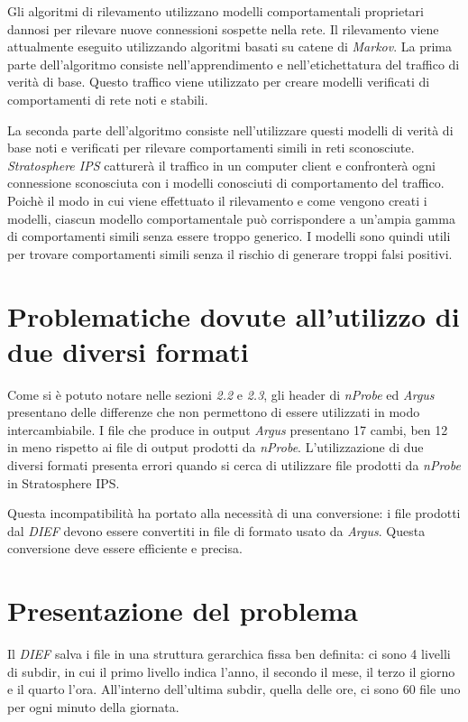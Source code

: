 \documentclass[../main.tex]{subfiles}
\begin{document}
Gli algoritmi di rilevamento utilizzano modelli comportamentali proprietari dannosi per rilevare nuove connessioni sospette nella rete. Il rilevamento viene attualmente eseguito utilizzando algoritmi basati su catene di \textit{Markov}.
La prima parte dell'algoritmo consiste nell'apprendimento e nell'etichettatura del traffico di verità di base. Questo traffico viene utilizzato per creare modelli verificati di comportamenti di rete noti e stabili. \newline

La seconda parte dell'algoritmo consiste nell'utilizzare questi modelli di verità di base noti e verificati per rilevare comportamenti simili in reti sconosciute. \textit{Stratosphere IPS} catturerà il traffico in un computer client e confronterà ogni connessione sconosciuta con i modelli conosciuti di comportamento del traffico. Poichè il modo in cui viene effettuato il rilevamento e come vengono creati i modelli, ciascun modello comportamentale può corrispondere a un'ampia gamma di comportamenti simili senza essere troppo generico. I modelli sono quindi utili per trovare comportamenti simili senza il rischio di generare troppi falsi positivi.


\section{Problematiche dovute all'utilizzo di due diversi formati}
Come si è potuto notare nelle sezioni \textit{2.2} e \textit{2.3}, gli header di \textit{nProbe} ed \textit{Argus} presentano delle differenze che non permettono di essere utilizzati in modo intercambiabile. I file che produce in output \textit{Argus} presentano 17 cambi, ben 12 in meno rispetto ai file di output prodotti da \textit{nProbe}.
L'utilizzazione di due diversi formati presenta errori quando si cerca di utilizzare file prodotti da \textit{nProbe} in Stratosphere IPS. \newline

Questa incompatibilità ha portato alla necessità di una conversione: i file prodotti dal \textit{DIEF} devono essere convertiti in file di formato usato da \textit{Argus}. Questa conversione deve essere efficiente e precisa.

\section{Presentazione del problema}
Il \textit{DIEF} salva i file in una struttura gerarchica fissa ben definita: ci sono 4 livelli di subdir, in cui il primo livello indica l'anno, il secondo il mese, il terzo il giorno e il quarto l'ora. All'interno dell'ultima subdir, quella delle ore, ci sono 60 file uno per ogni minuto della giornata.
\end{document}
